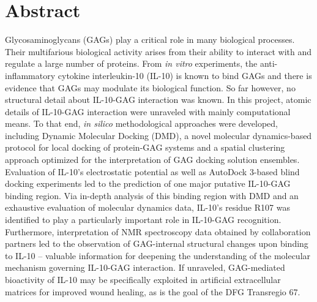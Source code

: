 \chapter{Abstract}
Glycosaminoglycans (GAGs) play a critical role in many biological processes. Their multifarious biological activity arises from their ability to interact with and regulate a large number of proteins. From \textit{in vitro} experiments, the anti-inflammatory cytokine interleukin-10 (IL-10) is known to bind GAGs and there is evidence that GAGs may modulate its biological function. So far however, no structural detail about IL-10-GAG interaction was known. In this project, atomic details of IL-10-GAG interaction were unraveled with mainly computational means. To that end, \textit{in silico} methodological approaches were developed, including Dynamic Molecular Docking (DMD), a novel molecular dynamics-based protocol for local docking of protein-GAG systems and a spatial clustering approach optimized for the interpretation of GAG docking solution ensembles. Evaluation of IL-10's electrostatic potential as well as AutoDock 3-based blind docking experiments led to the prediction
of one major putative IL-10-GAG binding region. Via in-depth analysis of this binding region with DMD and an exhaustive evaluation of molecular dynamics data, IL-10's residue R107 was identified to play a particularly important role in IL-10-GAG recognition. Furthermore, interpretation of NMR spectroscopy data obtained by collaboration partners led to the observation of GAG-internal structural changes upon binding to IL-10 -- valuable information for deepening the understanding of the molecular mechanism governing IL-10-GAG interaction. If unraveled, GAG-mediated bioactivity of IL-10 may be specifically exploited in artificial extracellular matrices for improved wound healing, as is the goal of the DFG Transregio 67.